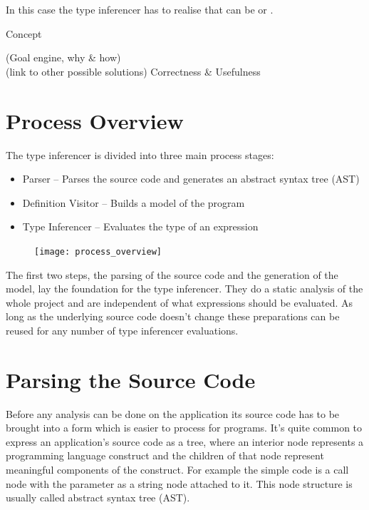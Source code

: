 \documentclass[12pt,halfparskip]{scrreprt}
\begin{document}
In this case the type inferencer has to realise that  can be  or .

{Concept}

(Goal engine, why \& how) \\
(link to other possible solutions)
Correctness \& Usefulness \\

\section{Process Overview}


The type inferencer is divided into three main process stages:

\begin{itemize}
	\item Parser – Parses the source code and generates an abstract syntax tree (AST)
	\item Definition Visitor – Builds a model of the program
	\item Type Inferencer – Evaluates the type of an expression
\end{itemize}

\begin{figure}[h!]
 \centering
 \texttt{[image: process\_overview]}
 \label{fig:process_overview}
\end{figure}



The first two steps, the parsing of the source code and the generation of the model, lay the foundation for the type inferencer. They do a static analysis of the whole project and are independent of what expressions should be evaluated. As long as the underlying source code doesn't change these preparations can be reused for any number of type inferencer evaluations.


\section{Parsing the Source Code}

Before any analysis can be done on the application its source code has to be brought into a form which is easier to process for programs. It's quite common to express an application's source code as a tree, where an interior node represents a programming language construct and the children of that node represent meaningful components of the construct. For example the simple code  is a call node with the parameter as a string node attached to it. This node structure is usually called abstract syntax tree (AST).
\end{document}
